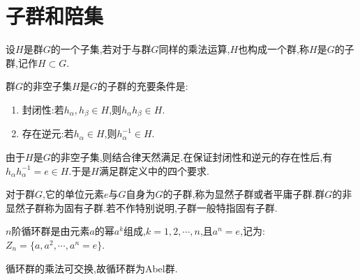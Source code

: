 \section{子群和陪集}
\begin{definition}[子群]
    设$H$是群$G$的一个子集,若对于与群$G$同样的乘法运算,$H$也构成一个群,称$H$是$G$的子群,记作$H\subset G$.
\end{definition}
\begin{corollary}
    群$G$的非空子集$H$是$G$的子群的充要条件是:
    \begin{enumerate}
        \item 封闭性:若$h_\alpha,h_\beta \in H$,则$h_\alpha h_\beta \in H$.
        \item 存在逆元:若$h_\alpha \in H $,则$h_\alpha^{-1}\in H$.
    \end{enumerate}
\end{corollary}
\begin{remark}
    由于$H$是$G$的非空子集,则结合律天然满足.在保证封闭性和逆元的存在性后,有$h_\alpha h_\alpha^{-1}=e \in H$.于是$H$满足群定义中的四个要求.
\end{remark}
对于群$G$,它的单位元素$e$与$G$自身为$G$的子群,称为显然子群或者平庸子群.群$G$的非显然子群称为固有子群.若不作特别说明,子群一般特指固有子群.
\begin{definition}[循环群]
    $n$阶循环群是由元素$a$的幂$a^k$组成,$k=1,2,\cdots,n$,且$a^n=e$,记为:$Z_n=\{a,a^2,\cdots,a^n=e\}$.
\end{definition}
循环群的乘法可交换,故循环群为Abel群.

